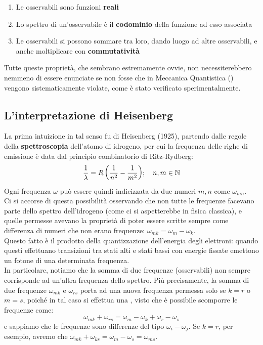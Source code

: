 \documentclass[FisicaTeorica.tex]{subfiles}
\begin{document}
\begin{enumerate}
    \item Le osservabili sono funzioni \textbf{reali}
    \item Lo spettro di un'osservabile è il \textbf{codominio} della funzione ad esso associata
    \item Le osservabili si possono sommare tra loro, dando luogo ad altre osservabili, e anche moltiplicare con \textbf{commutatività}
\end{enumerate}
Tutte queste proprietà, che sembrano estremamente ovvie, non necessiterebbero nemmeno di essere enunciate se non fosse che in Meccanica Quantistica (\MQ) vengono sistematicamente violate, come è stato verificato sperimentalmente.

\subsection{L'interpretazione di Heisenberg}
La prima intuizione in tal senso fu di Heisenberg (1925), partendo dalle regole della \textbf{spettroscopia} dell'atomo di idrogeno, per cui la frequenza delle righe di emissione è data dal principio combinatorio di Ritz-Rydberg:
\[
{\displaystyle {\frac {1}{\lambda }}=R\left({\frac {1}{n^{2}}}-{\frac {1}{m^{2}}}\right)}; \quad n,m \in \mathbb{N}
\]
Ogni frequenza $\omega$ può essere quindi indicizzata da due numeri $m,n$ come $\omega_{mn}$.\\
Ci si accorse di questa possibilità osservando che non tutte le frequenze facevano parte dello spettro dell'idrogeno (come ci si aspetterebbe in fisica classica), e quelle permesse avevano la proprietà di poter essere scritte sempre come differenza di numeri che non erano frequenze: $\omega_{mk} = \omega_m - \omega_k$.\\
Questo fatto è il prodotto della quantizzazione dell'energia degli elettroni: quando questi effettuano transizioni tra stati alti e stati bassi con energie fissate emettono un fotone di una determinata frequenza.\\
In particolare, notiamo che la somma di due frequenze (osservabili) non sempre corrisponde ad un'altra frequenza dello spettro. Più precisamente, la somma di due frequenze $\omega_{mk}$ e $\omega_{rs}$ porta ad una nuova frequenza permessa solo se $k=r$ o $m=s$, poiché in tal caso si effettua una , visto che è possibile scomporre le frequenze come:
\[
\omega_{mk} + \omega_{rs} = \omega_m - \omega_k + \omega_r -\omega_s
\]
e sappiamo che le frequenze  sono differenze del tipo $\omega_i - \omega_j$. Se $k = r$, per esempio, avremo che $\omega_{mk} + \omega_{ks} = \omega_m - \omega_s = \omega_{ms}$.\\
\end{document}
